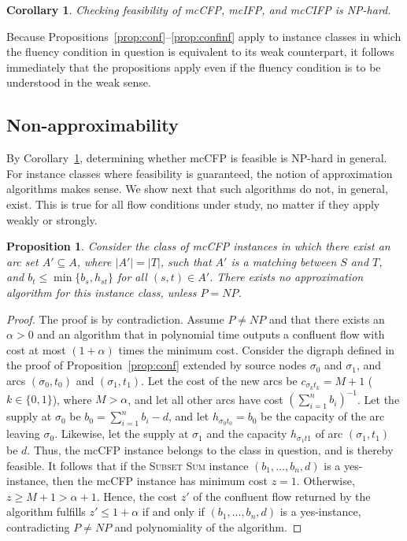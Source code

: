 \documentclass[pdflatex,sn-mathphys-num]{sn-jnl}%
\theoremstyle{thmstyleone}%
\newtheorem{proposition}[theorem]{Proposition}%
\newtheorem{corollary}[theorem]{Corollary}%
\begin{document}
\begin{corollary} \label{cor:nphard}
Checking feasibility of mcCFP, mcIFP, and mcCIFP is NP-hard.
\end{corollary}

Because Propositions~\ref{prop:conf}--\ref{prop:confinf} apply to instance classes in which the fluency condition in question is equivalent to its
weak counterpart, it follows immediately that the propositions apply even if the fluency condition is to be understood in the weak sense.

\subsection{Non-approximability} \label{sec:approx}
By Corollary~\ref{cor:nphard}, determining whether mcCFP is feasible is NP-hard in general. For instance classes where feasibility is guaranteed, the notion of approximation algorithms makes sense. We show next that such algorithms do not, in general, exist. 
This is true for all flow conditions under study, no matter if they apply weakly or strongly.

\begin{proposition} \label{prop:appr}
Consider the class of mcCFP instances in which there exist an arc set $A'\subseteq A$, where $|A'|=|T|$, such that $A'$ is a matching between $S$ and $T$, and $b_t\leq\min\{b_s,h_{st}\}$ for all $(s,t)\in A'$. There exists no approximation algorithm for this instance class, unless $P=NP$.
\end{proposition}
\begin{proof}
The proof is by contradiction. Assume $P\neq NP$ and that there exists an $\alpha>0$ and an algorithm that in polynomial time outputs a confluent flow with cost at most $(1+\alpha)$ times the minimum cost.
Consider the digraph defined in the proof of Proposition~\ref{prop:conf} extended by source nodes $\sigma_0$ and $\sigma_1$, and arcs $(\sigma_0,t_0)$ and $(\sigma_1,t_1)$.
Let the cost of the new arcs be $c_{\sigma_kt_k}=M+1$ ($k\in\{0,1\}$), where $M>\alpha$, and let all other arcs have cost $(\sum_{i=1}^nb_i)^{-1}$. Let the supply at $\sigma_0$ be $b_0=\sum_{i=1}^nb_i-d$, and let $h_{\sigma_0t_0}=b_0$ be the capacity of the arc leaving $\sigma_0$.
Likewise, let the supply at $\sigma_1$ and the capacity $h_{\sigma_1t1}$ of arc $(\sigma_1,t_1)$ be $d$.
Thus, the mcCFP instance belongs to the class in question, and is thereby feasible.
It follows that if the \textsc{Subset Sum} instance $(b_1,\ldots,b_n,d)$ is a yes-instance, then the mcCFP instance has minimum cost $z=1$.
Otherwise, $z\geq M+1>\alpha+1$.
Hence, the cost $z'$ of the confluent flow returned by the algorithm fulfills $z'\leq 1+\alpha$ if and only if $(b_1,\ldots,b_n,d)$ is a yes-instance, contradicting $P\neq NP$ and polynomiality of the algorithm.
\end{proof}
\end{document}
